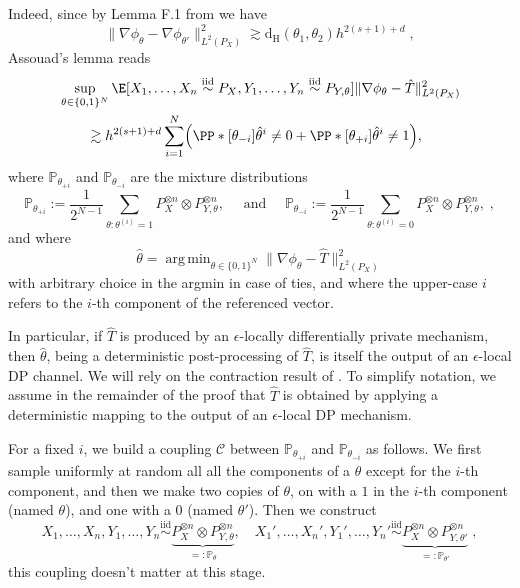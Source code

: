 \documentclass{article}
\DeclareMathOperator*{\argmin}{arg\,min}
\newcommand{\1}{\mathds{1}}
\newcommand{\iid}{\stackrel{\text{iid}}{\sim}}
\newcommand{\ham}{\mathrm{d}_{\mathrm{H}}}
\DeclarePairedDelimiter{\paren}{\lparen}{\rparen}
\theoremstyle{plain}
\theoremstyle{definition}
\theoremstyle{remark}
\begin{document}
Indeed, since by Lemma F.1 from \cite{lalanne2025PrivateOTMaps} we have 
\begin{equation}
        \|\nabla \phi_{\theta} - \nabla \phi_{\theta'} \|_{L^2(P_X)}^2
        \gtrsim \ham (\theta_1, \theta_2) h^{2 (s+1) + d} \;,
    \end{equation}
Assouad's lemma reads
\begin{equation}
    \label{jhbkqjshdf}
    \begin{aligned}
        &\sup_{\theta \in \{0, 1 \}^{N}} 
        \E[X_1, \dots, X_n \iid P_X, Y_1, \dots, Y_n \iid P_{Y, \theta}]{\|\nabla \phi_{\theta} - \hat{T} \|_{L^2(P_X)}^2 } \\
        &\qquad\gtrsim h^{2 (s+1) + d} \sum_{i=1}^{N} \paren*{\PP*[{{\theta_{-i}}}] {\hat{\theta}^i \neq 0} + \PP*[{{\theta_{+i}}}] {\hat{\theta}^i \neq 1}},
    \end{aligned}
    \end{equation}
    where $\mathbb P_{{{\theta_{+i}}}}$ and $\mathbb P_{{{\theta_{-i}}}}$ are the mixture distributions
    \begin{equation}
        \mathbb P_{{{\theta_{+i}}}} := \frac{1}{2^{N-1}} \sum_{\theta: \theta^{(i)} = 1} P_X^{\otimes n} \otimes P_{Y, \theta}^{\otimes n}, 
        \quad \text{ and } 
        \quad 
        \mathbb P_{{{\theta_{-i}}}} := \frac{1}{2^{N-1}} \sum_{\theta: \theta^{(i)} = 0} P_X^{\otimes n} \otimes P_{Y, \theta}^{\otimes n},\;,
    \end{equation}
    and where 
    \begin{equation}
        \hat{\theta} = \argmin_{\theta \in \{0,1\}^N} \|\nabla \phi_{\theta} -\hat T  \|_{L^2(P_X)}^2
    \end{equation}
    with arbitrary choice in the argmin in case of ties, and where the upper-case $i$ refers to the $i$-th component of the referenced vector.

   


    In particular, if $\hat T$ is produced by an $\epsilon$-locally differentially
private mechanism, then $\hat\theta$, being a deterministic post-processing of
$\hat T$, is itself the output of an $\epsilon$-local DP channel. We will rely
on the contraction result of \cite{duchi2013local}. To simplify notation, we
assume in the remainder of the proof that $\hat T$ is obtained by applying a
deterministic mapping to the output of an $\epsilon$-local DP mechanism.


    For a fixed $i$, we build a coupling $\mathcal{C}$ between $\mathbb P_{{{\theta_{+i}}}}$ and $ \mathbb P_{{{\theta_{-i}}}}$ as follows. We first sample uniformly at random all all the components of a $\theta$ except for the $i$-th component, and then we make two copies of $\theta$, on with a $1$ in the $i$-th component (named $\theta$), and one with a $0$ (named $\theta'$). Then we construct
    \begin{equation}
        X_1, \dots, X_n, Y_1, \dots, Y_n \iid  \underbrace{P_X^{\otimes n} \otimes P_{Y, \theta}^{\otimes n}}_{=: \mathbb P_{\theta} }, \quad 
        X_1', \dots, X_n', Y_1', \dots, Y_n' \iid  \underbrace{P_X^{\otimes n} \otimes P_{Y, \theta'}^{\otimes n}}_{=: \mathbb P_{\theta'} } \;,
    \end{equation}this coupling doesn't matter at this stage.
\end{document}
